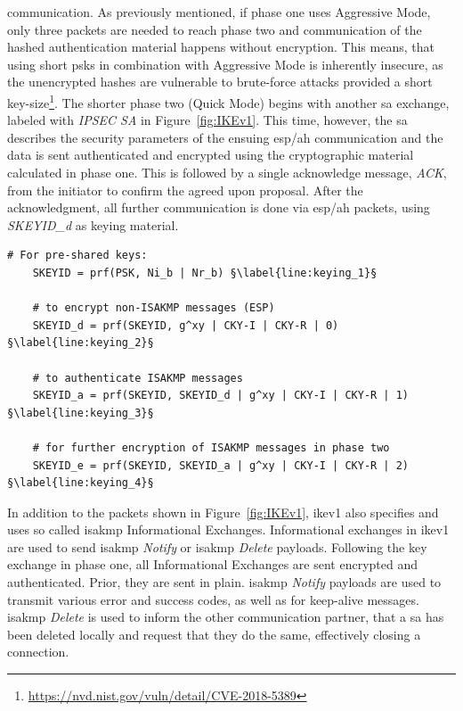 communication. As previously mentioned, if phase one uses Aggressive Mode, only three packets are needed to reach phase two and communication of the hashed authentication material happens without encryption. This means, that using short \acp{psk} in combination with Aggressive Mode is inherently insecure, as the unencrypted hashes are vulnerable to brute-force attacks provided a short key-size\footnote{\url{https://nvd.nist.gov/vuln/detail/CVE-2018-5389}}. The shorter phase two (Quick Mode) begins with another \ac{sa} exchange, labeled with \emph{IPSEC SA} in Figure~\ref{fig:IKEv1}. This time, however, the \ac{sa} describes the security parameters of the ensuing \ac{esp}/\ac{ah} communication and the data is sent authenticated and encrypted using the cryptographic material calculated in phase one. This is followed by a single acknowledge message, \emph{ACK}, from the initiator to confirm the agreed upon proposal. After the acknowledgment, all further communication is done via \ac{esp}/\ac{ah} packets, using \emph{SKEYID\_d} as keying material. \\

\begin{lstlisting}[float=ht, caption=IKE keying material construction., label=lst:keying, escapechar=§]
	# For pre-shared keys: 
	SKEYID = prf(PSK, Ni_b | Nr_b) §\label{line:keying_1}§
	
	# to encrypt non-ISAKMP messages (ESP)
	SKEYID_d = prf(SKEYID, g^xy | CKY-I | CKY-R | 0) §\label{line:keying_2}§
	
	# to authenticate ISAKMP messages
	SKEYID_a = prf(SKEYID, SKEYID_d | g^xy | CKY-I | CKY-R | 1) §\label{line:keying_3}§
	
	# for further encryption of ISAKMP messages in phase two
	SKEYID_e = prf(SKEYID, SKEYID_a | g^xy | CKY-I | CKY-R | 2) §\label{line:keying_4}§
\end{lstlisting}

\newpage
In addition to the packets shown in Figure~\ref{fig:IKEv1}, \ac{ike}v1 also specifies and uses so called \ac{isakmp} Informational Exchanges. Informational exchanges in \ac{ike}v1 are used to send \ac{isakmp} \emph{Notify} or \ac{isakmp} \emph{Delete} payloads. Following the key exchange in phase one, all Informational Exchanges are sent encrypted and authenticated. Prior, they are sent in plain. \ac{isakmp} \emph{Notify} payloads are used to transmit various error and success codes, as well as for keep-alive messages. \ac{isakmp} \emph{Delete} is used to inform the other communication partner, that a \ac{sa} has been deleted locally and request that they do the same, effectively closing a connection. \\

